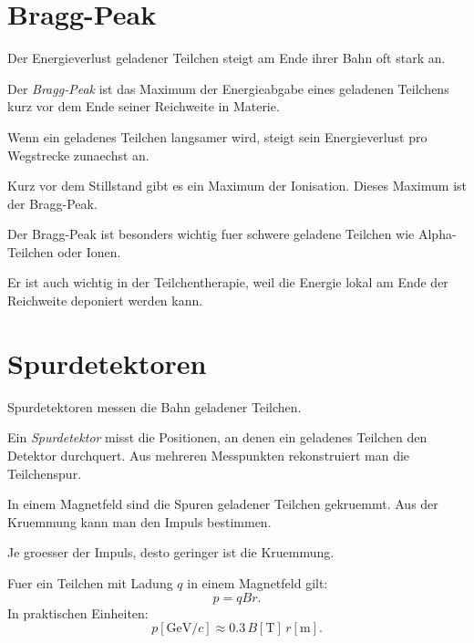 \section{Bragg-Peak}

Der Energieverlust geladener Teilchen steigt am Ende ihrer Bahn oft stark an.

\begin{definitionbox}
Der \emph{Bragg-Peak} ist das Maximum der Energieabgabe eines geladenen Teilchens
kurz vor dem Ende seiner Reichweite in Materie.
\end{definitionbox}

\begin{conceptbox}
Wenn ein geladenes Teilchen langsamer wird, steigt sein Energieverlust pro Wegstrecke
zunaechst an.

Kurz vor dem Stillstand gibt es ein Maximum der Ionisation.
Dieses Maximum ist der Bragg-Peak.
\end{conceptbox}

\begin{examtipbox}
Der Bragg-Peak ist besonders wichtig fuer schwere geladene Teilchen wie Alpha-Teilchen
oder Ionen.

Er ist auch wichtig in der Teilchentherapie, weil die Energie lokal am Ende der
Reichweite deponiert werden kann.
\end{examtipbox}

\section{Spurdetektoren}

Spurdetektoren messen die Bahn geladener Teilchen.

\begin{definitionbox}
Ein \emph{Spurdetektor} misst die Positionen, an denen ein geladenes Teilchen den
Detektor durchquert.
Aus mehreren Messpunkten rekonstruiert man die Teilchenspur.
\end{definitionbox}

\begin{conceptbox}
In einem Magnetfeld sind die Spuren geladener Teilchen gekruemmt.
Aus der Kruemmung kann man den Impuls bestimmen.

Je groesser der Impuls, desto geringer ist die Kruemmung.
\end{conceptbox}

\begin{formulabox}
Fuer ein Teilchen mit Ladung $q$ in einem Magnetfeld gilt:
\[
    p = qBr.
\]
In praktischen Einheiten:
\[
    p[\mathrm{GeV}/c]
    \approx
    0.3\,B[\mathrm{T}]\,r[\mathrm{m}].
\]
\end{formulabox}


